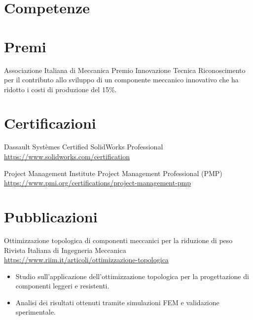 \documentclass[a4paper, serif, 10pt]{moderncv}
\begin{document}
\section{Competenze}

\section{Premi}

        {Associazione Italiana di Meccanica}
        {Premio Innovazione Tecnica}
        {}
        {}
        {Riconoscimento per il contributo allo sviluppo di un componente meccanico innovativo che ha ridotto i costi di produzione del 15\%.}
\section{Certificazioni}

        {Dassault Systèmes}
        {Certified SolidWorks Professional}
        {\url{https://www.solidworks.com/certification}}
        {}
        {}

        {Project Management Institute}
        {Project Management Professional (PMP)}
        {\url{https://www.pmi.org/certifications/project-management-pmp}}
        {}
        {}
\section{Pubblicazioni}

        {Ottimizzazione topologica di componenti meccanici per la riduzione di peso}
        {Rivista Italiana di Ingegneria Meccanica}
        {\url{https://www.riim.it/articoli/ottimizzazione-topologica}}
        {}
        {\begin{itemize}
\item Studio sull'applicazione dell'ottimizzazione topologica per la progettazione di componenti leggeri e resistenti.
\item Analisi dei risultati ottenuti tramite simulazioni FEM e validazione sperimentale.
\end{itemize}}
\end{document}

